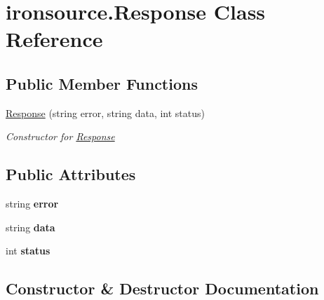 \hypertarget{classironsource_1_1_response}{}\section{ironsource.\+Response Class Reference}
\label{classironsource_1_1_response}
\subsection*{Public Member Functions}
\begin{DoxyCompactItemize}
\item 
\hyperlink{classironsource_1_1_response_ac08cd47de9418a45ff3074a54f585fa8}{Response} (string error, string data, int status)
\begin{DoxyCompactList}\small\item\em Constructor for \hyperlink{classironsource_1_1_response}{Response} \end{DoxyCompactList}\end{DoxyCompactItemize}
\subsection*{Public Attributes}
\begin{DoxyCompactItemize}
\item 
string {\bfseries error}\hypertarget{classironsource_1_1_response_a7b317681cddc3ae155330158fd28d67a}{}\label{classironsource_1_1_response_a7b317681cddc3ae155330158fd28d67a}

\item 
string {\bfseries data}\hypertarget{classironsource_1_1_response_ac02908ae1e2e1b56225bb46f5b67b796}{}\label{classironsource_1_1_response_ac02908ae1e2e1b56225bb46f5b67b796}

\item 
int {\bfseries status}\hypertarget{classironsource_1_1_response_a59d670ef3a0e4b0de9ef813bc7c6bdb9}{}\label{classironsource_1_1_response_a59d670ef3a0e4b0de9ef813bc7c6bdb9}

\end{DoxyCompactItemize}


\subsection{Constructor \& Destructor Documentation}
